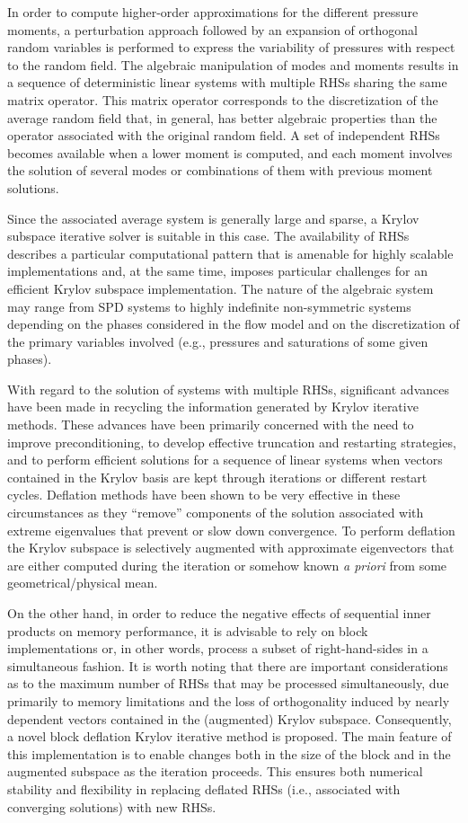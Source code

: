\documentclass{report}
\begin{document}
In order to compute higher-order approximations for the different
pressure moments, a perturbation approach followed by an expansion of
orthogonal random variables is performed to express the variability of
pressures with respect to the random field. The algebraic manipulation of
modes and moments results in a sequence of deterministic linear systems
with multiple RHSs sharing the same matrix operator. This matrix operator
corresponds to the discretization of the average random field that, in
general, has better algebraic properties than the operator associated
with the original random field. A set of independent RHSs becomes
available when a lower moment is computed, and each moment involves the
solution of several modes or combinations of them with previous moment
solutions.

Since the associated average system is generally large and sparse, a
Krylov subspace iterative solver is suitable in this case. The
availability of RHSs describes a particular computational pattern that is
amenable for highly scalable implementations and, at the same time,
imposes particular challenges for an efficient Krylov subspace
implementation. The nature of the algebraic system may range from SPD
systems to highly indefinite non-symmetric systems depending on the
phases considered in the flow model and on the discretization of the
primary variables involved (e.g., pressures and saturations of some given
phases).

With regard to the solution of systems with multiple RHSs, significant
advances have been made in recycling the information generated by Krylov
iterative methods. These advances have been primarily concerned with the
need to improve preconditioning, to develop effective truncation and
restarting strategies, and to perform efficient solutions for a sequence
of linear systems when vectors contained in the Krylov basis are kept
through iterations or different restart cycles. Deflation methods have
been shown to be very effective in these circumstances as they ``remove''
components of the solution associated with extreme eigenvalues that
prevent or slow down convergence. To perform deflation the Krylov
subspace is selectively augmented with approximate eigenvectors that are
either computed during the iteration or somehow known \emph{a priori}
from some geometrical/physical mean.

On the other hand, in order to reduce the negative effects of sequential
inner products on memory performance, it is advisable to rely on block
implementations or, in other words, process a subset of right-hand-sides
in a simultaneous fashion. It is worth noting that there are important
considerations as to the maximum number of RHSs that may be processed
simultaneously, due primarily to memory limitations and the loss of
orthogonality induced by nearly dependent vectors contained in the
(augmented) Krylov subspace. Consequently, a novel block deflation Krylov
iterative method is proposed. The main feature of this implementation is
to enable changes both in the size of the block and in the augmented
subspace as the iteration proceeds. This ensures both numerical stability
and flexibility in replacing deflated RHSs (i.e., associated with
converging solutions) with new RHSs.
\end{document}
